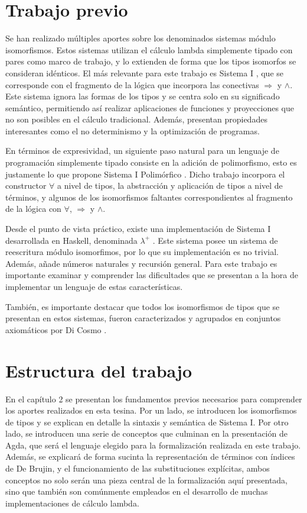 \section{Trabajo previo}

Se han realizado múltiples aportes sobre los denominados sistemas módulo isomorfismos.
Estos sistemas utilizan el cálculo lambda simplemente tipado con pares como marco de trabajo, y lo extienden de forma que los tipos isomorfos se consideran idénticos.
El más relevante para este trabajo es Sistema I \cite{system-i}, que se corresponde con el fragmento de la lógica que incorpora las conectivas $\Rightarrow$ y $\wedge$.
Este sistema ignora las formas de los tipos y se centra solo en su significado semántico, permitiendo así realizar aplicaciones de funciones y proyecciones que no son posibles en el cálculo tradicional.
Además, presentan propiedades interesantes como el no determinismo y la optimización de programas.

En términos de expresividad, un siguiente paso natural para un lenguaje de programación simplemente tipado consiste en la adición de polimorfismo, esto es justamente lo que propone Sistema I Polimórfico \cite{sip}.
Dicho trabajo incorpora el constructor $\forall$ a nivel de tipos, la abstracción y aplicación de tipos a nivel de términos, y algunos de los isomorfismos faltantes correspondientes al fragmento de la lógica con $\forall$, $\Rightarrow$ y $\wedge$.

Desde el punto de vista práctico, existe una implementación de Sistema I desarrollada en Haskell, denominada $\lambda^+$ \cite{lambda-plus}.
Este sistema posee un sistema de reescritura módulo isomorfimos, por lo que su implementación es no trivial.
Además, añade números naturales y recursión general.
Para este trabajo es importante examinar y comprender las dificultades que se presentan a la hora de implementar un lenguaje de estas características.

También, es importante destacar que todos los isomorfismos de tipos que se presentan en estos sistemas, fueron caracterizados y agrupados en conjuntos axiomáticos por Di Cosmo \cite{MSCSSurvey05}.

\section{Estructura del trabajo}

En el capítulo 2 se presentan los fundamentos previos necesarios para comprender los aportes realizados en esta tesina.
Por un lado, se introducen los isomorfismos de tipos y se explican en detalle la sintaxis y semántica de Sistema I.
Por otro lado, se introducen una serie de conceptos que culminan en la presentación de Agda, que será el lenguaje elegido para la formalización realizada en este trabajo.
Además, se explicará de forma sucinta la representación de términos con índices de De Brujin, y el funcionamiento de las substituciones explícitas, ambos conceptos no solo serán una pieza central de la formalización aquí presentada, sino que también son comúnmente empleados en el desarrollo de muchas implementaciones de cálculo lambda.

